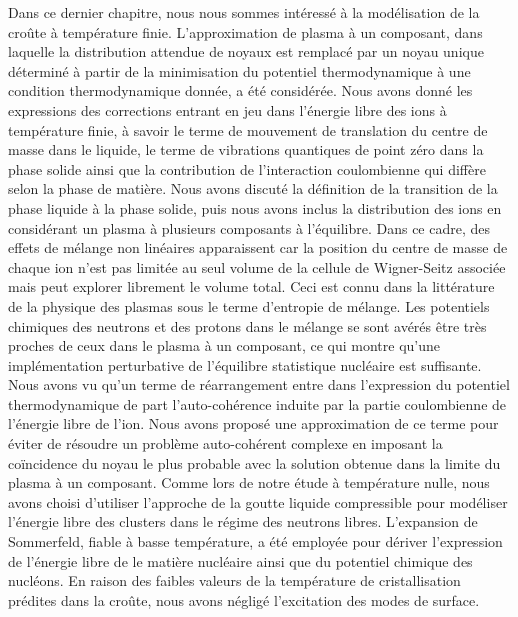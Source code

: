 Dans ce dernier chapitre, nous nous sommes intéressé à la modélisation de la 
croûte à température finie. 
L'approximation de plasma à un composant, dans laquelle la distribution 
attendue de noyaux est remplacé par un noyau unique déterminé à partir de la 
minimisation du potentiel thermodynamique à une condition thermodynamique 
donnée, a été considérée. 
Nous avons donné les expressions des corrections entrant en jeu dans l'énergie 
libre des ions à température finie, à savoir le terme de mouvement de 
translation du centre de masse dans le liquide, le terme de vibrations 
quantiques de point zéro dans la phase solide ainsi que la contribution de 
l'interaction coulombienne qui diffère selon la phase de matière. 
Nous avons discuté la définition de la transition de la phase liquide à la
phase solide, puis nous avons inclus la distribution des ions en considérant un 
plasma à plusieurs composants à l'équilibre. 
%
Dans ce cadre, des effets de mélange non linéaires apparaissent car la 
position du centre de masse de chaque ion n'est pas limitée au seul volume de 
la cellule de Wigner-Seitz associée mais peut explorer librement le 
volume total. 
Ceci est connu dans la littérature de la physique des plasmas sous le terme 
d'\guillemotleft entropie de mélange\guillemotright.
Les potentiels chimiques des neutrons et des protons dans le mélange se sont 
avérés être très proches de ceux dans le plasma à un composant, ce qui montre 
qu'une implémentation perturbative de l'équilibre statistique nucléaire est 
suffisante.
%
Nous avons vu qu'un terme de réarrangement entre dans l'expression du 
potentiel thermodynamique de part l'auto-cohérence induite par la partie 
coulombienne de l'énergie libre de l'ion. 
Nous avons proposé une approximation de ce terme pour éviter de 
résoudre un problème auto-cohérent complexe en imposant la coïncidence du noyau
le plus probable avec la solution obtenue dans la limite du plasma à un 
composant. 
Comme lors de notre étude à température nulle, nous avons choisi d'utiliser 
l'approche de la goutte liquide compressible pour modéliser l'énergie libre des
clusters dans le régime des neutrons libres. 
L'expansion de Sommerfeld, fiable à basse température, a été employée pour 
dériver l'expression de l'énergie libre de le matière nucléaire ainsi que 
du potentiel chimique des nucléons. 
En raison des faibles valeurs de la température de cristallisation prédites 
dans la croûte, nous avons négligé l'excitation des modes de surface.

